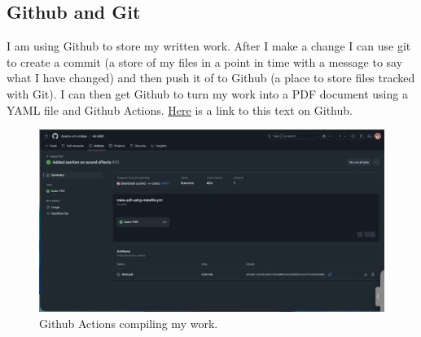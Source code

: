 \documentclass[12pt]{article}
\begin{document}
	\subsection{Github and Git}
	I am using Github to store my written work. After I make a change I can use git to create a commit (a store of my files in a point in time with a message to say what I have changed) and then push it of to Github (a place to store files tracked with Git). I can then get Github to turn my work into a PDF document using a YAML file and Github Actions. \href{https://github.com/dylanru-sm-college/A2-GDD}{Here} is a link to this text on Github.
	\begin{figure}[h]
			\includegraphics[scale=0.29]{githubActionsUI.png}
			\centering
			\caption{Github Actions compiling my work.} 
	\end{figure}

	\newpage
	{\setlength{\parskip}{0pt}%
	
	}
	
\end{document}
